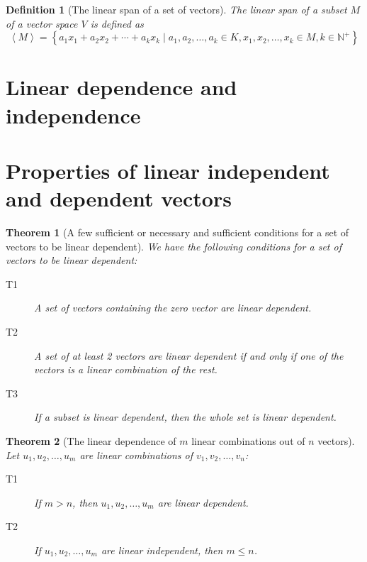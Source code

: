 \documentclass[onecolumn]{ctexart}
\newtheorem{definition}{Definition}
\newtheorem{theorem}{Theorem}
\begin{document}
\begin{definition}[The linear span of a set of vectors]
  The linear span of a subset $M$ of a vector space $V$ is defined as
  \begin{equation}
    \left\langle M \right\rangle = \left\{ a_1x_1 + a_2x_2 + \cdots + a_kx_k \mid a_1, a_2, \ldots, a_k \in K, x_1, x_2, \ldots, x_k \in M, k \in \mathbb{N}^+ \right\} 
  \end{equation}
\end{definition}

\section{Linear dependence and independence}

\section{Properties of linear independent and dependent vectors}

\begin{theorem}[A few sufficient or necessary and sufficient conditions for a set of vectors to be linear dependent]
  We have the following conditions for a set of vectors to be linear dependent:
  \begin{description}
    \item[T1] A set of vectors containing the zero vector are linear dependent.
    \item[T2] A set of at least 2 vectors are linear dependent if and only if one of the vectors is a linear combination of the rest.
    \item[T3] If a subset is linear dependent, then the whole set is linear dependent.
  \end{description}
\end{theorem}

\begin{theorem}[The linear dependence of $m$ linear combinations out of $n$ vectors]
  Let $u_1, u_2, \ldots, u_m$ are linear combinations of $v_1, v_2, \ldots, v_n$:
  \begin{description}
    \item[T1] If $m > n$, then $u_1, u_2, \ldots, u_m$ are linear dependent.
    \item[T2] If $u_1, u_2, \ldots, u_m$ are linear independent, then $m \leq n$.
  \end{description}
\end{theorem}
\end{document}
